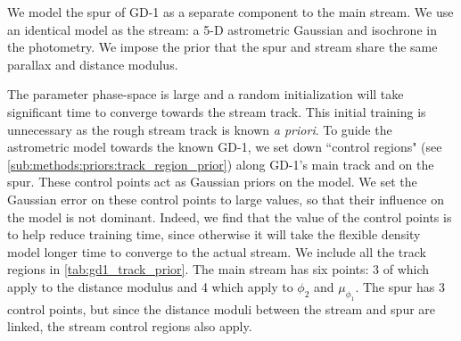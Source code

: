 \documentclass[twocolumn]{aastex631}
\newcommand{\stream}[1]{#1}
\begin{document}
        We model the spur of \stream{GD-1} as a separate component to the main
        stream. We use an identical model as the stream: a 5-D astrometric Gaussian and isochrone in the photometry. We impose the prior that the spur and stream
        share the same parallax and distance modulus.

        The parameter phase-space is large and a random initialization will take significant
        time to converge towards the stream track. This initial training is
        unnecessary as the rough stream track is known \textit{a priori}.
        To guide the astrometric model towards the known \stream{GD-1},
        we set down ``control regions" (see \autoref{sub:methods:priors:track_region_prior})
        along \stream{GD-1}'s main track and on the spur.
        These control points act as Gaussian priors
        on the model. We set the Gaussian error on these control points to large
        values, so that their influence on the model is not dominant. Indeed, we
        find that the value of the control points is to help reduce training
        time, since otherwise it will take the flexible density model longer
        time to converge to the actual stream.
        We include all the track regions in \autoref{tab:gd1_track_prior}.
        The main stream has six points: 3 of which apply to the distance modulus
        and 4 which apply to $\phi_2$ and $\mu_{\phi_1}$.
        The spur has 3 control points, but since the distance moduli between the stream and spur are linked, the stream control regions also apply.
\end{document}

